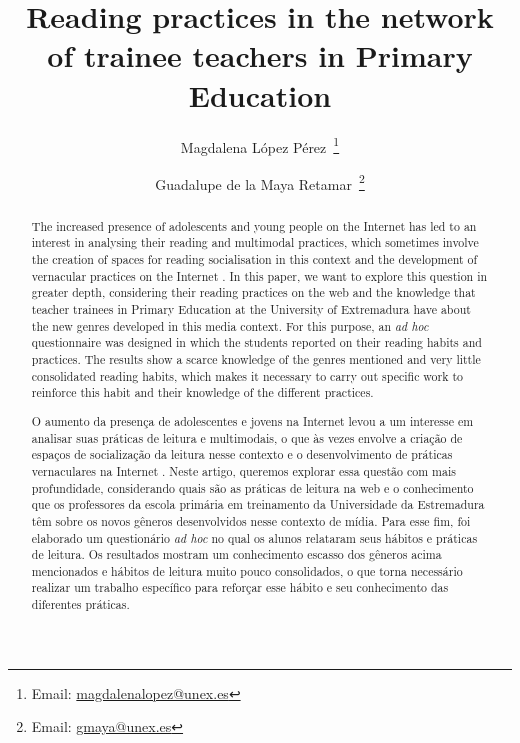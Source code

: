 \documentclass[english]{textolivre}
\title{Reading practices in the network of trainee teachers in Primary Education}
\author[1]{Magdalena López Pérez~\orcid{0000-0001-6233-1719}\thanks{Email: \href{mailto:magdalenalopez@unex.es}{magdalenalopez@unex.es}}}
\author[1]{Guadalupe de la Maya Retamar~\orcid{0000-0003-4201-4024}\thanks{Email: \href{mailto:gmaya@unex.es}{gmaya@unex.es}}}
\affil[1]{Universidad de Extremadura, Facultad de Educación y Psicología, Departamento de Didáctica de las Ciencias Sociales, las Lenguas y las Literaturas, Badajoz, España.}
\begin{document}
\maketitle

\begin{polyabstract}
\begin{abstract}
The increased presence of adolescents and young people on the Internet has led to an interest in analysing their reading and multimodal practices, which sometimes involve the creation of spaces for reading socialisation in this context and the development of vernacular practices on the Internet \cite{cassany_en_linea._2012}. In this paper, we want to explore this question in greater depth, considering their reading practices on the web and the knowledge that teacher trainees in Primary Education at the University of Extremadura have about the new genres developed in this media context. For this purpose, an \textit{ad hoc} questionnaire was designed in which the students reported on their reading habits and practices. The results show a scarce knowledge of the genres mentioned and very little consolidated reading habits, which makes it necessary to carry out specific work to reinforce this habit and their knowledge of the different practices.

\end{abstract}

\begin{portuguese}
\begin{abstract}
O aumento da presença de adolescentes e jovens na Internet levou a um interesse em analisar suas práticas de leitura e multimodais, o que às vezes envolve a criação de espaços de socialização da leitura nesse contexto e o desenvolvimento de práticas vernaculares na Internet \cite{cassany_en_linea._2012}. Neste artigo, queremos explorar essa questão com mais profundidade, considerando quais são as práticas de leitura na web e o conhecimento que os professores da escola primária em treinamento da Universidade da Estremadura têm sobre os novos gêneros desenvolvidos nesse contexto de mídia. Para esse fim, foi elaborado um questionário \textit{ad hoc} no qual os alunos relataram seus hábitos e práticas de leitura. Os resultados mostram um conhecimento escasso dos gêneros acima mencionados e hábitos de leitura muito pouco consolidados, o que torna necessário realizar um trabalho específico para reforçar esse hábito e seu conhecimento das diferentes práticas. 

\end{abstract}
\end{portuguese}
\end{polyabstract}
\end{document}
